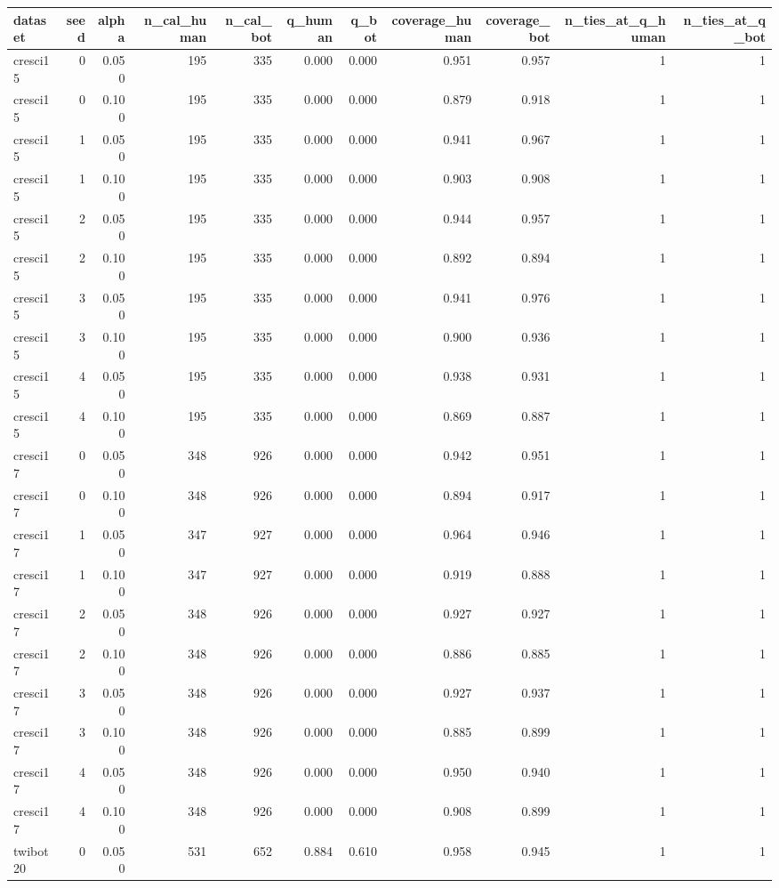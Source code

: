 \begin{tabular}{lrrrrrrrrrr}
\toprule
dataset & seed & alpha & n_cal_human & n_cal_bot & q_human & q_bot & coverage_human & coverage_bot & n_ties_at_q_human & n_ties_at_q_bot \\
\midrule
cresci15 & 0 & 0.050 & 195 & 335 & 0.000 & 0.000 & 0.951 & 0.957 & 1 & 1 \\
cresci15 & 0 & 0.100 & 195 & 335 & 0.000 & 0.000 & 0.879 & 0.918 & 1 & 1 \\
cresci15 & 1 & 0.050 & 195 & 335 & 0.000 & 0.000 & 0.941 & 0.967 & 1 & 1 \\
cresci15 & 1 & 0.100 & 195 & 335 & 0.000 & 0.000 & 0.903 & 0.908 & 1 & 1 \\
cresci15 & 2 & 0.050 & 195 & 335 & 0.000 & 0.000 & 0.944 & 0.957 & 1 & 1 \\
cresci15 & 2 & 0.100 & 195 & 335 & 0.000 & 0.000 & 0.892 & 0.894 & 1 & 1 \\
cresci15 & 3 & 0.050 & 195 & 335 & 0.000 & 0.000 & 0.941 & 0.976 & 1 & 1 \\
cresci15 & 3 & 0.100 & 195 & 335 & 0.000 & 0.000 & 0.900 & 0.936 & 1 & 1 \\
cresci15 & 4 & 0.050 & 195 & 335 & 0.000 & 0.000 & 0.938 & 0.931 & 1 & 1 \\
cresci15 & 4 & 0.100 & 195 & 335 & 0.000 & 0.000 & 0.869 & 0.887 & 1 & 1 \\
cresci17 & 0 & 0.050 & 348 & 926 & 0.000 & 0.000 & 0.942 & 0.951 & 1 & 1 \\
cresci17 & 0 & 0.100 & 348 & 926 & 0.000 & 0.000 & 0.894 & 0.917 & 1 & 1 \\
cresci17 & 1 & 0.050 & 347 & 927 & 0.000 & 0.000 & 0.964 & 0.946 & 1 & 1 \\
cresci17 & 1 & 0.100 & 347 & 927 & 0.000 & 0.000 & 0.919 & 0.888 & 1 & 1 \\
cresci17 & 2 & 0.050 & 348 & 926 & 0.000 & 0.000 & 0.927 & 0.927 & 1 & 1 \\
cresci17 & 2 & 0.100 & 348 & 926 & 0.000 & 0.000 & 0.886 & 0.885 & 1 & 1 \\
cresci17 & 3 & 0.050 & 348 & 926 & 0.000 & 0.000 & 0.927 & 0.937 & 1 & 1 \\
cresci17 & 3 & 0.100 & 348 & 926 & 0.000 & 0.000 & 0.885 & 0.899 & 1 & 1 \\
cresci17 & 4 & 0.050 & 348 & 926 & 0.000 & 0.000 & 0.950 & 0.940 & 1 & 1 \\
cresci17 & 4 & 0.100 & 348 & 926 & 0.000 & 0.000 & 0.908 & 0.899 & 1 & 1 \\
twibot20 & 0 & 0.050 & 531 & 652 & 0.884 & 0.610 & 0.958 & 0.945 & 1 & 1 \\

\end{tabular}
